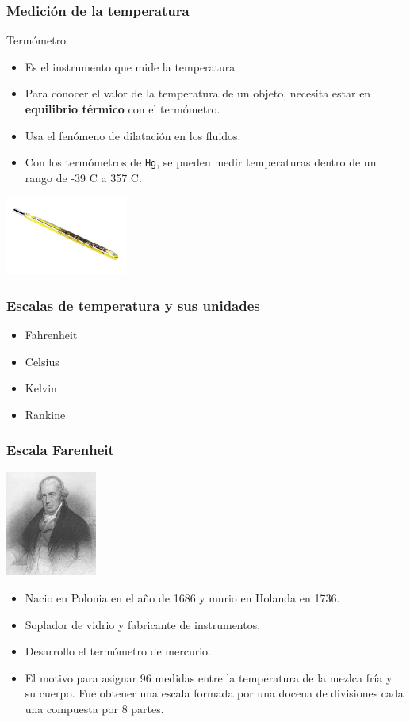 \documentclass[handout]{beamer}
\begin{document}
\begin{frame}
  \frametitle{Medición de la temperatura}
  \begin{block}{Termómetro}
    \begin{itemize}
    \item Es el instrumento que mide la temperatura
    \item Para conocer el valor de la temperatura de un objeto, necesita estar en
      \textbf{equilibrio térmico} con el termómetro.
    \item Usa el fenómeno de dilatación en los fluidos.
    \item Con los termómetros de \texttt{Hg}, se pueden medir temperaturas dentro de un
      rango de -39 \textdegree C a 357 \textdegree C.
    \end{itemize}
  \end{block}
  \begin{center}
    \includegraphics[width=4cm]{termometro}
  \end{center}
\end{frame}


\begin{frame}
  \frametitle{Escalas de temperatura y sus unidades}
  \begin{itemize}
  \item Fahrenheit
  \item Celsius
  \item Kelvin
  \item Rankine
  \end{itemize}


\end{frame}


\begin{frame}
  \frametitle{Escala Farenheit}
  \begin{center}
    \includegraphics[width=3cm]{farenheit}
  \end{center}
  \begin{itemize}
  \item Nacio en Polonia en el año de 1686 y murio en Holanda en 1736.
  \item Soplador de vidrio y fabricante de instrumentos.
  \item Desarrollo el termómetro de mercurio.
  \item El motivo para asignar 96 medidas entre la temperatura de la mezlca fría y su
    cuerpo. Fue obtener una escala formada por una docena de divisiones cada una compuesta
    por 8 partes. 
  \end{itemize}
\end{frame}
\end{document}
